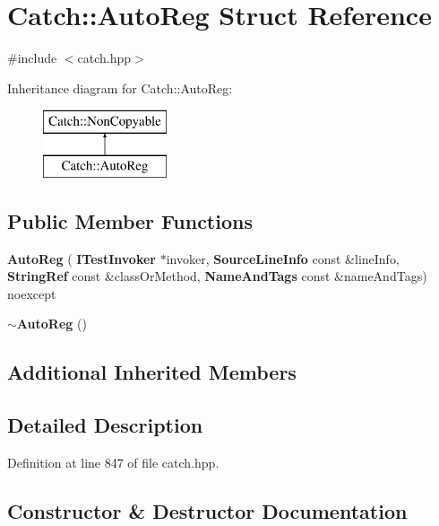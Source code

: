 \section{Catch\+::Auto\+Reg Struct Reference}
\label{struct_catch_1_1_auto_reg}


{\ttfamily \#include $<$catch.\+hpp$>$}

Inheritance diagram for Catch\+::Auto\+Reg\+:\begin{figure}[H]
\begin{center}
\leavevmode
\includegraphics[height=2.000000cm]{struct_catch_1_1_auto_reg}
\end{center}
\end{figure}
\subsection*{Public Member Functions}
\begin{DoxyCompactItemize}
\item 
\textbf{ Auto\+Reg} (\textbf{ I\+Test\+Invoker} $\ast$invoker, \textbf{ Source\+Line\+Info} const \&line\+Info, \textbf{ String\+Ref} const \&class\+Or\+Method, \textbf{ Name\+And\+Tags} const \&name\+And\+Tags) noexcept
\item 
\textbf{ $\sim$\+Auto\+Reg} ()
\end{DoxyCompactItemize}
\subsection*{Additional Inherited Members}


\subsection{Detailed Description}


Definition at line 847 of file catch.\+hpp.



\subsection{Constructor \& Destructor Documentation}
\mbox{\label{struct_catch_1_1_auto_reg_a7eba02fb9d80b9896bf5a6517369af28}} 
